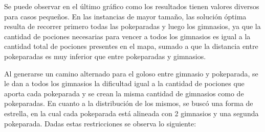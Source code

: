 \vspace*{0.3cm} \vspace*{0.3cm}
\begin{figure} [!ht]
 \centering
       \label{fig:anilloexacto}
    \label{fig:anillogoloso}
    \end{figure}
\vspace*{0.3cm} \vspace*{0.3cm}

Se puede observar en el \'ultimo gr\'afico como los resultados tienen valores diversos para casos pequeños. En las instancias de mayor tamaño, las solución óptima resulta de recorrer primero todas las pokeparadas y luego los gimnasios, ya que la cantidad de pociones necesarias para vencer a todos los gimnasios es igual a la cantidad total de pociones presentes en el mapa, sumado a que la distancia entre pokeparadas es muy inferior que entre pokeparadas y gimnasios.

Al generarse un camino alternado para el goloso entre gimnasio y pokeparada, se le dan a todos los gimnasios la dificultad igual a la cantidad de pociones que aporta cada pokeparada y se crean la misma cantidad de gimnasios como de pokeparadas. En cuanto a la distribución de los mismos, se buscó una forma de estrella, en la cual cada pokeparada está alineada con 2 gimnasios y una segunda pokeparada. Dadas estas restricciones se observa lo siguiente:

